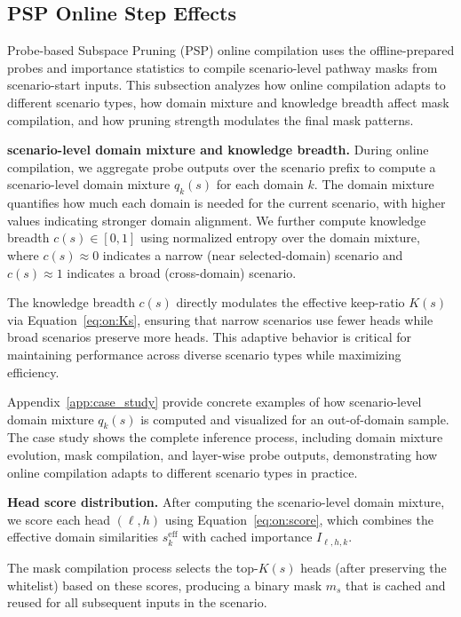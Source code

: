 \subsection{PSP Online Step Effects}
\label{app:pipeline_effects_psp_online}

Probe-based Subspace Pruning (PSP) online compilation uses the offline-prepared probes and importance statistics to compile scenario-level pathway masks from scenario-start inputs.
This subsection analyzes how online compilation adapts to different scenario types, how domain mixture and knowledge breadth affect mask compilation, and how pruning strength modulates the final mask patterns.

\textbf{scenario-level domain mixture and knowledge breadth.}
During online compilation, we aggregate probe outputs over the scenario prefix to compute a scenario-level domain mixture $q_k(s)$ for each domain $k$.
The domain mixture quantifies how much each domain is needed for the current scenario, with higher values indicating stronger domain alignment.
We further compute knowledge breadth $c(s) \in [0,1]$ using normalized entropy over the domain mixture, where $c(s) \approx 0$ indicates a narrow (near selected-domain) scenario and $c(s) \approx 1$ indicates a broad (cross-domain) scenario.

The knowledge breadth $c(s)$ directly modulates the effective keep-ratio $K(s)$ via Equation~\eqref{eq:on:Ks}, ensuring that narrow scenarios use fewer heads while broad scenarios preserve more heads.
This adaptive behavior is critical for maintaining performance across diverse scenario types while maximizing efficiency.

Appendix~\ref{app:case_study} provide concrete examples of how scenario-level domain mixture $q_k(s)$ is computed and visualized for an out-of-domain sample.
The case study shows the complete inference process, including domain mixture evolution, mask compilation, and layer-wise probe outputs, demonstrating how online compilation adapts to different scenario types in practice.

\textbf{Head score distribution.}
After computing the scenario-level domain mixture, we score each head $(\ell,h)$ using Equation~\eqref{eq:on:score}, which combines the effective domain similarities $s_k^{\text{eff}}$ with cached importance $I_{\ell,h,k}$.

The mask compilation process selects the top-$K(s)$ heads (after preserving the whitelist) based on these scores, producing a binary mask $m_s$ that is cached and reused for all subsequent inputs in the scenario.

